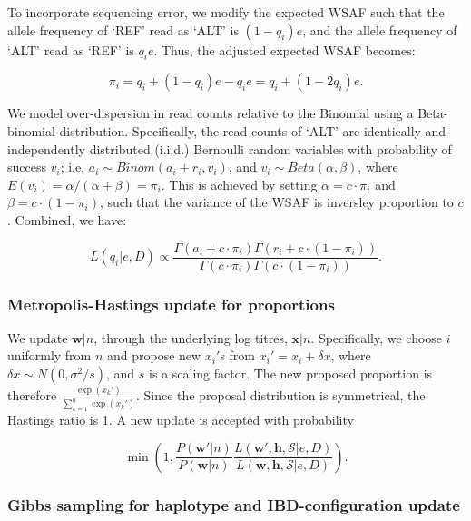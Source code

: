 \documentclass{article}
\begin{document}
To incorporate sequencing error, we modify the expected WSAF such that the allele frequency of `REF' read as `ALT' is $(1 - q_i)e$, and the allele frequency of `ALT' read as `REF' is $q_ie$. Thus, the adjusted expected WSAF becomes:

\begin{equation}
\pi_i = q_i + (1 - q_i)e - q_ie = q_i + (1 - 2q_i)e.\label{eqn:adj_q}
\end{equation}

\noindent We model over-dispersion in read counts relative to the Binomial using a Beta-binomial distribution. Specifically, the read counts of `ALT' are identically and independently distributed (i.i.d.) Bernoulli random variables with probability of success $v_i$; i.e. $a_i \sim Binom(a_i + r_i, v_i)$, and $v_i \sim Beta(\alpha, \beta)$, where $E(v_i) = \alpha/(\alpha+\beta) = \pi_{i}$. This is achieved by setting $\alpha = c\cdot \pi_{i} $ and $\beta = c\cdot (1-\pi_{i})$, such that the variance of the WSAF is inversley proportion to $c$.  Combined, we have:

\begin{equation}
L(q_{i}| e, D) \propto \frac{\Gamma(a_i + c\cdot \pi_{i}) \Gamma(r_i + c\cdot (1-\pi_{i}))}{\Gamma(c\cdot \pi_{i})\Gamma(c\cdot (1-\pi_{i}))}. \label{eqn:llk}
\end{equation}


\subsubsection{Metropolis-Hastings update for proportions}\label{sec:updateP}
We update $\mathbf{w}|n$, through the underlying log titres, $\mathbf{x}|n$. Specifically, we choose $i$ uniformly from $n$ and propose new $x_i'$s from $x_i' = x_i + \delta x$, where $\delta x \sim N(0, \sigma^2/s)$, and $s$ is a scaling factor. The new proposed proportion is therefore $\frac{\exp(x_k')}{\sum_{k=1}^n \exp(x_k')}$. Since the proposal distribution is symmetrical, the Hastings ratio is 1. A new update is accepted with probability

 $$\min\left(1, \frac{P(\mathbf{w}'|n)}{P(\mathbf{w}|n)} \frac{L(\mathbf{w}', \mathbf{h}, {\mathcal S} | e, D)}{L(\mathbf{w}, \mathbf{h}, {\mathcal S} | e, D)}\right).$$

\subsubsection{Gibbs sampling for haplotype and IBD-configuration update}
\end{document}
